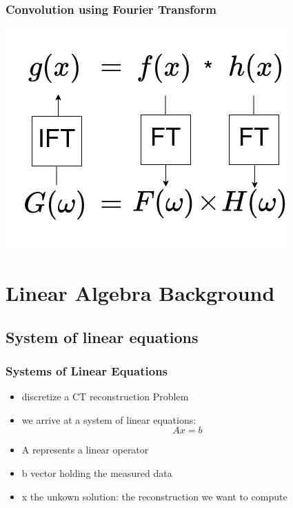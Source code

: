 \documentclass{beamer}
\begin{document}
\begin{frame}
	\frametitle{Convolution using Fourier Transform}
\center
	\includegraphics[scale =0.6]{media/convolution&fourier.png}
\end{frame}

\section{Linear Algebra Background}
\subsection{System of linear equations}
\begin{frame}
\frametitle{Systems of Linear Equations}
	\begin{itemize}
	\item discretize a CT reconstruction Problem 
	\item we arrive at a system of linear equations:
	$$ Ax = b$$
		 \pause
	\item A represents a linear operator 
	\item b vector holding the measured data
	\item x the unkown solution: the reconstruction we want to compute
	\end{itemize}
\end{frame}
\end{document}
